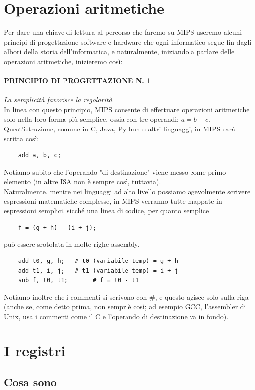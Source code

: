 \documentclass[class=book, crop=false]{standalone}
\begin{document}
\section{Operazioni aritmetiche}
Per dare una chiave di lettura al percorso che faremo su MIPS useremo alcuni principi di progettazione software e hardware che ogni informatico segue fin dagli albori della storia dell'informatica, e naturalmente, iniziando a parlare delle operazioni aritmetiche,  inizieremo così:
\paragraph{PRINCIPIO DI PROGETTAZIONE N. 1}
\emph{La semplicità favorisce la regolarità}.\\

In linea con questo principio, MIPS consente di effettuare operazioni aritmetiche solo nella loro forma più semplice, ossia con tre operandi: \(a = b + c\).
Quest'istruzione, comune in C, Java, Python o altri linguaggi, in MIPS sarà scritta così:
\begin{verbatim}
	add a, b, c;
\end{verbatim}

Notiamo subito che l'operando "di destinazione" viene messo come primo elemento (in altre ISA non è sempre così, tuttavia).\\
Naturalmente, mentre nei linguaggi ad alto livello possiamo agevolmente scrivere espressioni matematiche complesse, in MIPS verranno tutte mappate in espressioni semplici, sicché una linea di codice, per quanto semplice
\begin{verbatim}
	f = (g + h) - (i + j);
\end{verbatim}
può essere srotolata in molte righe assembly.
\begin{verbatim}
	add t0, g, h;	# t0 (variabile temp) = g + h
	add t1, i, j;	# t1 (variabile temp) = i + j
	sub f, t0, t1;       # f = t0 - t1
\end{verbatim}
Notiamo inoltre che i commenti si scrivono con \#, e questo agisce solo sulla riga (anche se, come detto prima, non sempr è così; ad esempio GCC, l'assembler di Unix, usa i commenti come il C e l'operando di destinazione va in fondo).

\section{I registri}

\subsection{Cosa sono}
\end{document}
